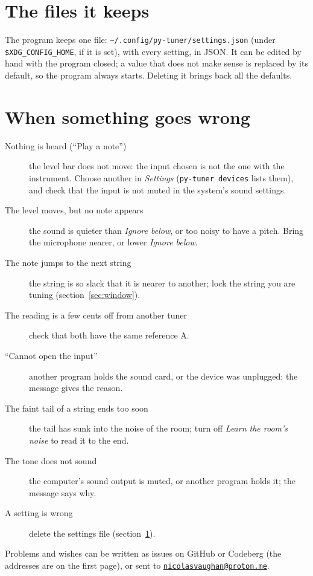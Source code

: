 \documentclass[12pt,
              article,
              oneside
              ]{memoir}
\newcommand*{\menu}[1]{\textit{#1}}
\begin{document}
\section{The files it keeps}
\label{sec:files}

%
The program keeps one file: \texttt{\textasciitilde/.config/py-tuner/settings.json}
(under \texttt{\$XDG\_CONFIG\_HOME}, if it is set), with every setting, in
JSON. It can be edited by hand with the program closed; a value that does
not make sense is replaced by its default, so the program always starts.
Deleting it brings back all the defaults.

\section{When something goes wrong}

%
\begin{description}
\item[Nothing is heard (``Play a note'')] the level bar does not move: the
  input chosen is not the one with the instrument. Choose another in
  \menu{Settings} (\texttt{py-tuner devices} lists them), and check that
  the input is not muted in the system's sound settings.
\item[The level moves, but no note appears] the sound is quieter than
  \menu{Ignore below}, or too noisy to have a pitch. Bring the microphone
  nearer, or lower \menu{Ignore below}.
\item[The note jumps to the next string] the string is so slack that it
  is nearer to another; lock the string you are tuning
  (section~\ref{sec:window}).
\item[The reading is a few cents off from another tuner] check that both
  have the same reference A.
\item[``Cannot open the input''] another program holds the sound card, or
  the device was unplugged; the message gives the reason.
\item[The faint tail of a string ends too soon] the tail has sunk into the
  noise of the room; turn off \menu{Learn the room's noise} to read it to
  the end.
\item[The tone does not sound] the computer's sound output is muted, or
  another program holds it; the message says why.
\item[A setting is wrong] delete the settings file
  (section~\ref{sec:files}).
\end{description}

\noindent
Problems and wishes can be written as issues on GitHub or
Codeberg (the addresses are on the first page), or sent to
\href{mailto:nicolasvaughan@proton.me}{\texttt{nicolasvaughan@proton.me}}.

\printindex
\end{document}
